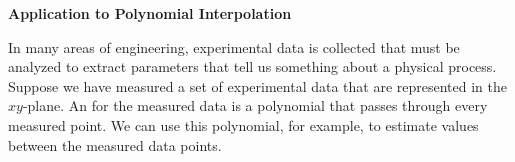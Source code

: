 \item \textbf{Application to Polynomial Interpolation}

In many areas of engineering, experimental data is collected that must be analyzed to extract parameters that tell us something about a physical process. Suppose we have measured a set of experimental data that are represented in the $xy$-plane. An  for the measured data is a polynomial that passes through every measured point. We can use this polynomial, for example, to estimate values between the measured data points. \\

